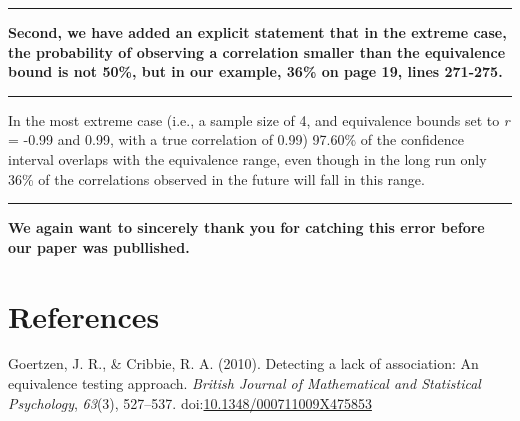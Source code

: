 \documentclass[man]{apa6}
\begin{document}
\begin{center}\rule{0.5\linewidth}{\linethickness}\end{center}

\textbf{Second, we have added an explicit statement that in the extreme case, the probability of observing a correlation smaller than the equivalence bound is not 50\%, but in our example, 36\% on page 19, lines 271-275.}

\begin{center}\rule{0.5\linewidth}{\linethickness}\end{center}

In the most extreme case (i.e., a sample size of 4, and equivalence bounds set to \emph{r} = -0.99 and 0.99, with a true correlation of 0.99) 97.60\% of the confidence interval overlaps with the equivalence range, even though in the long run only 36\% of the correlations observed in the future will fall in this range.

\begin{center}\rule{0.5\linewidth}{\linethickness}\end{center}

\textbf{We again want to sincerely thank you for catching this error before our paper was publlished.}

\newpage

\hypertarget{references}{%
\section{References}\label{references}}

\begingroup
\setlength{\parindent}{-0.5in}
\setlength{\leftskip}{0.5in}

\hypertarget{refs}{}
\leavevmode\hypertarget{ref-goertzen_detecting_2010}{}%
Goertzen, J. R., \& Cribbie, R. A. (2010). Detecting a lack of association: An equivalence testing approach. \emph{British Journal of Mathematical and Statistical Psychology}, \emph{63}(3), 527--537. doi:\href{https://doi.org/10.1348/000711009X475853}{10.1348/000711009X475853}

\endgroup
\end{document}
